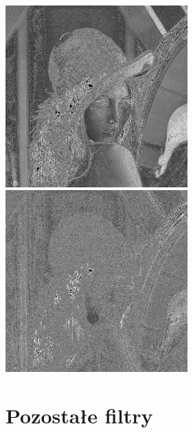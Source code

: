 \documentclass[a4paper,12pt,openany]{report}
\begin{document}
\begin{center}
\\
\\
\includegraphics[width=7cm]{resources/modified/lena/lena_sharpen_11x11.jpg}
\includegraphics[width=7cm]{resources/modified/lena/lena_sharpen_21x21.jpg}
\end{center}

\pagebreak
\section{Pozostałe filtry}
\end{document}
